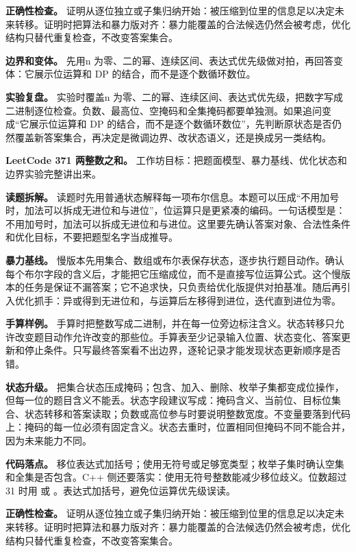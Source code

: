 \textbf{正确性检查。} 证明从逐位独立或子集归纳开始：被压缩到位里的信息足以决定未来转移。证明时把算法和暴力版对齐：暴力能覆盖的合法候选仍然会被考虑，优化结构只替代重复检查，不改变答案集合。

\textbf{边界和变体。} 先用n 为零、二的幂、连续区间、表达式优先级做对拍，再回答变体：它展示位运算和 DP 的结合，而不是逐个数循环数位。

\textbf{实验复盘。} 实验时覆盖n 为零、二的幂、连续区间、表达式优先级，把数字写成二进制逐位检查。负数、最高位、空掩码和全集掩码都要单独测。如果追问变成“它展示位运算和 DP 的结合，而不是逐个数循环数位”，先判断原状态是否仍然覆盖新答案集合，再决定是微调边界、改状态语义，还是换成另一类结构。

\noindent\textbf{LeetCode 371 两整数之和。} 工作坊目标：把题面模型、暴力基线、优化状态和边界实验完整讲出来。

\textbf{读题拆解。} 读题时先用普通状态解释每一项布尔信息。本题可以压成“不用加号时，加法可以拆成无进位和与进位”，位运算只是更紧凑的编码。一句话模型是：不用加号时，加法可以拆成无进位和与进位。这里要先确认答案对象、合法性条件和优化目标，不要把题型名字当成推导。

\textbf{暴力基线。} 慢版本先用集合、数组或布尔表保存状态，逐步执行题目动作。确认每个布尔字段的含义后，才能把它压缩成位，而不是直接写位运算公式。这个慢版本的任务是保证不漏答案；它不追求快，只负责给优化版提供对拍基准。随后再引入优化抓手：异或得到无进位和，与运算后左移得到进位，迭代直到进位为零。

\textbf{手算样例。} 手算时把整数写成二进制，并在每一位旁边标注含义。状态转移只允许改变题目动作允许改变的那些位。手算表至少记录输入位置、状态变化、答案更新和停止条件。只写最终答案看不出边界，逐轮记录才能发现状态更新顺序是否错。

\textbf{状态升级。} 把集合状态压成掩码；包含、加入、删除、枚举子集都变成位操作，但每一位的题目含义不能丢。状态字段建议写成：掩码含义、当前位、目标位集合、状态转移和答案读取；负数或高位参与时要说明整数宽度。不变量要落到代码上：掩码的每一位必须有固定含义。状态去重时，位置相同但掩码不同不能合并，因为未来能力不同。

\textbf{代码落点。} 移位表达式加括号；使用无符号或足够宽类型；枚举子集时确认空集和全集是否包含。C++ 侧还要落实：使用无符号整数能减少移位歧义。位数超过 31 时用  或 。表达式加括号，避免位运算优先级误读。

\textbf{正确性检查。} 证明从逐位独立或子集归纳开始：被压缩到位里的信息足以决定未来转移。证明时把算法和暴力版对齐：暴力能覆盖的合法候选仍然会被考虑，优化结构只替代重复检查，不改变答案集合。

